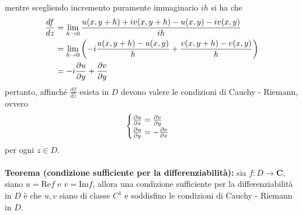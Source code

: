 \documentclass{article}
\begin{document}
mentre scegliendo incremento puramente immaginario $ih$ si ha che
\begin{align}
    \frac{df}{dz} &= \lim_{h \rightarrow 0}\frac{u(x, y + h) + iv(x, y + h) - u(x, y) - iv(x, y)}{ih} \notag \\
    &= \lim_{h \rightarrow 0}\left(-i\frac{u(x, y + h) - u(x, y)}{h} + \frac{v(x, y + h) - v(x, y)}{h}\right) \notag \\
    &= -i\frac{\partial u}{\partial y} + \frac{\partial v}{\partial y} \notag
\end{align}
pertanto, affinché $\frac{df}{dz}$ esista in $D$ devono valere le condizioni di Cauchy - Riemann, ovvero
\begin{gather}
    \begin{cases}
        \frac{\partial u}{\partial x} = \frac{\partial v}{\partial y} \\
        \frac{\partial u}{\partial y} = -\frac{\partial v}{\partial x}
    \end{cases} \notag
\end{gather}
per ogni $z \in D$. \\ \\
\textbf{Teorema (condizione sufficiente per la differenziabilità):} sia $f : D \longrightarrow \mathbf{C}$, siano $u = \mathrm{Re}f$ e $v = \mathrm{Im}f$, allora una condizione sufficiente per la differenziabilità in $D$ è che $u, v$ siano di classe $C^1$ e soddisfino le condizioni di Cauchy - Riemann in $D$. \\
\end{document}
